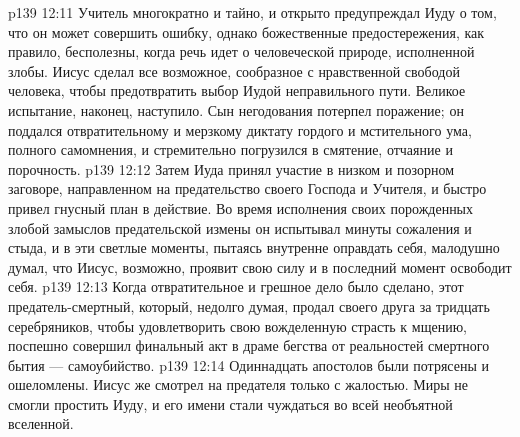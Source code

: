 \vs p139 12:11 Учитель многократно и тайно, и открыто предупреждал Иуду о том, что он может совершить ошибку, однако божественные предостережения, как правило, бесполезны, когда речь идет о человеческой природе, исполненной злобы. Иисус сделал все возможное, сообразное с нравственной свободой человека, чтобы предотвратить выбор Иудой неправильного пути. Великое испытание, наконец, наступило. Сын негодования потерпел поражение; он поддался отвратительному и мерзкому диктату гордого и мстительного ума, полного самомнения, и стремительно погрузился в смятение, отчаяние и порочность.
\vs p139 12:12 Затем Иуда принял участие в низком и позорном заговоре, направленном на предательство своего Господа и Учителя, и быстро привел гнусный план в действие. Во время исполнения своих порожденных злобой замыслов предательской измены он испытывал минуты сожаления и стыда, и в эти светлые моменты, пытаясь внутренне оправдать себя, малодушно думал, что Иисус, возможно, проявит свою силу и в последний момент освободит себя.
\vs p139 12:13 Когда отвратительное и грешное дело было сделано, этот предатель\hyp{}смертный, который, недолго думая, продал своего друга за тридцать серебряников, чтобы удовлетворить свою вожделенную страсть к мщению, поспешно совершил финальный акт в драме бегства от реальностей смертного бытия --- самоубийство.
\vs p139 12:14 Одиннадцать апостолов были потрясены и ошеломлены. Иисус же смотрел на предателя только с жалостью. Миры не смогли простить Иуду, и его имени стали чуждаться во всей необъятной вселенной.
